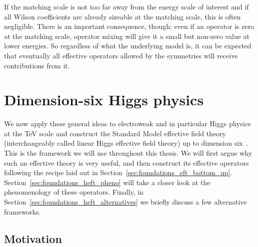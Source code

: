 If the matching scale is not too far away from the energy scale of
interest and if all Wilson coefficients are already sizeable at the
matching scale, this is often negligible. There is an important
consequence, though: even if an operator is zero at the matching
scale, operator mixing will give it a small but non-zero value at
lower energies. So regardless of what the underlying model is, it can
be expected that eventually all effective operators allowed by the
symmetries will receive contributions from it. 



\section{Dimension-six Higgs physics}
\label{sec:foundations_higgs_eft}

We now apply these general ideas to electroweak and in particular
Higgs physics at the TeV scale and construct the Standard Model
effective field theory (interchangeably called linear Higgs effective
field theory) up to dimension six~\cite{Burges:1983zg, Leung:1984ni,
  Buchmuller:1985jz, Arzt:1994gp}. This is the framework we will use
throughout this thesis. We will first argue why such an effective
theory is very useful, and then construct its effective operators
following the recipe laid out in
Section~\ref{sec:foundations_eft_bottom_up}. Section~\ref{sec:foundations_heft_pheno}
will take a closer look at the phenomenology of these
operators. Finally, in Section~\ref{sec:foundations_heft_alternatives}
we briefly discuss a few alternative frameworks.


  

\subsection{Motivation}
\label{sec:foundations_heft_motivation}


